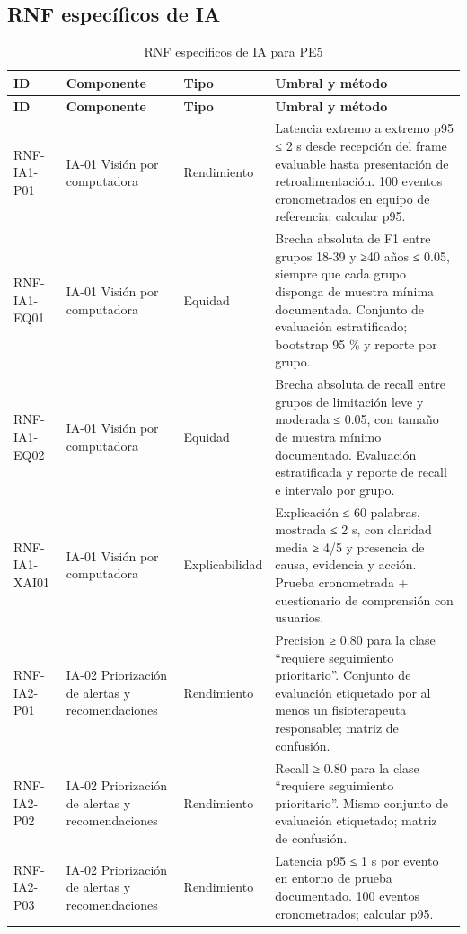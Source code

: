 \documentclass[12pt,a4paper]{article}
\begin{document}
\subsection{RNF específicos de IA}
\small
\begin{longtable}{p{}p{}p{}p{}}
\caption{RNF específicos de IA para PE5}\\\toprule
\textbf{ID}&\textbf{Componente}&\textbf{Tipo}&\textbf{Umbral y método}\\\midrule\endfirsthead
\toprule\textbf{ID}&\textbf{Componente}&\textbf{Tipo}&\textbf{Umbral y método}\\\midrule\endhead

RNF-IA1-P01 & IA-01 Visión por computadora & Rendimiento & Latencia extremo a extremo p95 ≤ 2 s desde recepción del frame evaluable hasta presentación de retroalimentación. 100 eventos cronometrados en equipo de referencia; calcular p95. \\
RNF-IA1-EQ01 & IA-01 Visión por computadora & Equidad & Brecha absoluta de F1 entre grupos 18-39 y ≥40 años ≤ 0.05, siempre que cada grupo disponga de muestra mínima documentada. Conjunto de evaluación estratificado; bootstrap 95 \% y reporte por grupo. \\
RNF-IA1-EQ02 & IA-01 Visión por computadora & Equidad & Brecha absoluta de recall entre grupos de limitación leve y moderada ≤ 0.05, con tamaño de muestra mínimo documentado. Evaluación estratificada y reporte de recall e intervalo por grupo. \\
RNF-IA1-XAI01 & IA-01 Visión por computadora & Explicabilidad & Explicación ≤ 60 palabras, mostrada ≤ 2 s, con claridad media ≥ 4/5 y presencia de causa, evidencia y acción. Prueba cronometrada + cuestionario de comprensión con usuarios. \\
RNF-IA2-P01 & IA-02 Priorización de alertas y recomendaciones & Rendimiento & Precision ≥ 0.80 para la clase “requiere seguimiento prioritario”. Conjunto de evaluación etiquetado por al menos un fisioterapeuta responsable; matriz de confusión. \\
RNF-IA2-P02 & IA-02 Priorización de alertas y recomendaciones & Rendimiento & Recall ≥ 0.80 para la clase “requiere seguimiento prioritario”. Mismo conjunto de evaluación etiquetado; matriz de confusión. \\
RNF-IA2-P03 & IA-02 Priorización de alertas y recomendaciones & Rendimiento & Latencia p95 ≤ 1 s por evento en entorno de prueba documentado. 100 eventos cronometrados; calcular p95. \\

\end{longtable}
\end{document}
